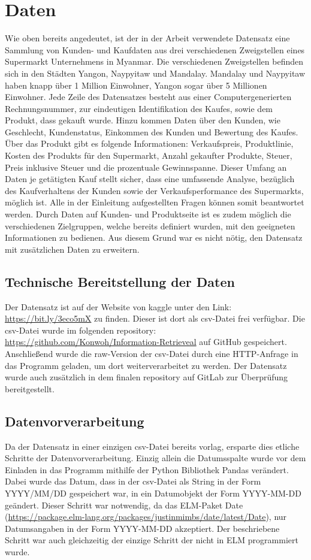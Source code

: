\documentclass[usegeometry=true]{scrartcl}
\begin{document}
\section{Daten}
Wie oben bereits angedeutet, ist der in der Arbeit verwendete Datensatz eine Sammlung von Kunden- und Kaufdaten aus drei verschiedenen Zweigstellen eines Supermarkt
Unternehmens in Myanmar. Die verschiedenen Zweigstellen befinden sich in den Städten Yangon, Naypyitaw und Mandalay. Mandalay und Naypyitaw haben knapp über 1 Million Einwohner,
Yangon sogar über 5 Millionen Einwohner. Jede Zeile des Datensatzes besteht aus einer Computergenerierten Rechnungsnummer, zur eindeutigen Identifikation des Kaufes, sowie dem
Produkt, dass gekauft wurde. Hinzu kommen Daten über den Kunden, wie Geschlecht, Kundenstatus, Einkommen des Kunden und Bewertung des Kaufes. Über das Produkt gibt es folgende
Informationen: Verkaufspreis, Produktlinie, Kosten des Produkts für den Supermarkt, Anzahl gekaufter Produkte, Steuer, Preis inklusive Steuer und die prozentuale Gewinnspanne.
Dieser Umfang an Daten je getätigten Kauf stellt sicher, dass eine umfassende Analyse, bezüglich des Kaufverhaltens der Kunden sowie der Verkaufsperformance des Supermarkts,
möglich ist. Alle in der Einleitung aufgestellten Fragen können somit beantwortet werden. Durch Daten auf Kunden- und Produktseite ist es zudem möglich die verschiedenen
Zielgruppen, welche bereits definiert wurden, mit den geeigneten Informationen zu bedienen. Aus diesem Grund war es nicht nötig, den Datensatz mit zusätzlichen Daten zu erweitern.

\subsection{Technische Bereitstellung der Daten}
Der Datensatz ist auf der Website von kaggle unter den Link: \url{https://bit.ly/3eco5mX} zu finden. Dieser ist dort als csv-Datei frei verfügbar. Die csv-Datei wurde im
folgenden repository: \url{https://github.com/Konwoh/Information-Retrieveal} auf GitHub gespeichert. Anschließend wurde die raw-Version der csv-Datei durch eine HTTP-Anfrage
in das Programm geladen, um dort weiterverarbeitet zu werden. Der Datensatz wurde auch zusätzlich in dem finalen repository auf GitLab zur Überprüfung bereitgestellt.

\subsection{Datenvorverarbeitung}
Da der Datensatz in einer einzigen csv-Datei bereits vorlag, ersparte dies etliche Schritte der Datenvorverarbeitung. Einzig allein die Datumsspalte wurde vor dem Einladen
in das Programm mithilfe der Python Bibliothek Pandas verändert. Dabei wurde das Datum, dass in der csv-Datei als String in der Form YYYY/MM/DD gespeichert war, in ein
Datumobjekt der Form YYYY-MM-DD geändert. Dieser Schritt war notwendig, da das ELM-Paket Date (\url{https://package.elm-lang.org/packages/justinmimbs/date/latest/Date}),
nur Datumsangaben in der Form YYYY-MM-DD akzeptiert. Der beschriebene Schritt war auch gleichzeitig der einzige Schritt der nicht in ELM programmiert wurde.
\end{document}
